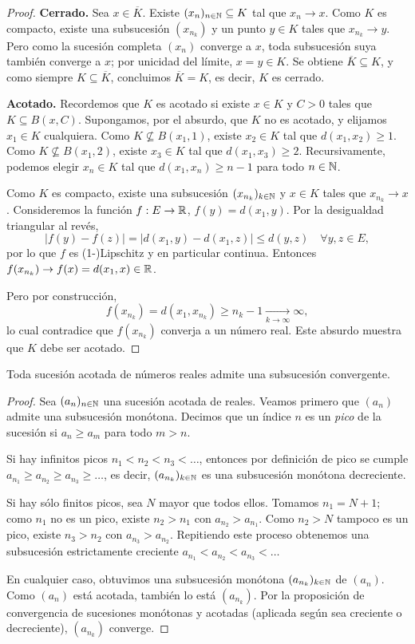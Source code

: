 \begin{proof}
\textbf{Cerrado.} Sea $x \in \overline{K}$. Existe $(x_n)_{n\in\mathbb{N}}\subseteq K$
tal que $x_n \to x$. Como $K$ es compacto, existe una subsucesión
$(x_{n_k})$ y un punto $y\in K$ tales que $x_{n_k}\to y$. Pero como la
sucesión completa $(x_n)$ converge a $x$, toda subsucesión suya también
converge a $x$; por unicidad del límite, $x=y \in K$. Se obtiene
$\overline{K}\subseteq K$, y como siempre $K\subseteq\overline{K}$,
concluimos $\overline{K}=K$, es decir, $K$ es cerrado.

\textbf{Acotado.} Recordemos que $K$ es acotado si existe $x\in K$ y $C>0$
tales que $K\subseteq B(x,C)$. Supongamos, por el absurdo, que $K$ no es
acotado, y elijamos $x_1\in K$ cualquiera. Como $K\not\subseteq B(x_1,1)$,
existe $x_2\in K$ tal que $d(x_1,x_2)\ge 1$. Como $K\not\subseteq
B(x_1,2)$, existe $x_3\in K$ tal que $d(x_1,x_3)\ge 2$. Recursivamente,
podemos elegir $x_n\in K$ tal que $d(x_1,x_n)\ge n-1$ para todo $n\in\mathbb{N}$.

Como $K$ es compacto, existe una subsucesión $(x_{n_k})_{k\in\mathbb{N}}$ y
$x\in K$ tales que $x_{n_k}\to x$. Consideremos la función
$f:E\to\mathbb{R}$, $f(y)=d(x_1,y)$. Por la desigualdad triangular al revés,
\[
|f(y)-f(z)| = |d(x_1,y)-d(x_1,z)| \le d(y,z) \quad \forall y,z\in E,
\]
por lo que $f$ es (1-)Lipschitz y en particular continua. Entonces
$f(x_{n_k})\to f(x) = d(x_1,x) \in \mathbb{R}$.

Pero por construcción,
\[
f(x_{n_k}) = d(x_1,x_{n_k}) \ge n_k - 1 \xrightarrow[k\to\infty]{} \infty,
\]
lo cual contradice que $f(x_{n_k})$ converja a un número real. Este
absurdo muestra que $K$ debe ser acotado.
\end{proof}

\begin{lema}
Toda sucesión acotada de números reales admite una subsucesión
convergente.
\end{lema}

\begin{proof}
Sea $(a_n)_{n\in\mathbb{N}}$ una sucesión acotada de reales. Veamos primero que
$(a_n)$ admite una subsucesión monótona. Decimos que un índice $n$ es un
\emph{pico} de la sucesión si $a_n \ge a_m$ para todo $m>n$.

Si hay infinitos picos $n_1<n_2<n_3<\dots$, entonces por definición de
pico se cumple $a_{n_1}\ge a_{n_2}\ge a_{n_3}\ge \dots$, es decir,
$(a_{n_k})_{k\in\mathbb{N}}$ es una subsucesión monótona decreciente.

Si hay sólo finitos picos, sea $N$ mayor que todos ellos. Tomamos
$n_1 = N+1$; como $n_1$ no es un pico, existe $n_2>n_1$ con
$a_{n_2}>a_{n_1}$. Como $n_2>N$ tampoco es un pico, existe $n_3>n_2$ con
$a_{n_3}>a_{n_2}$. Repitiendo este proceso obtenemos una subsucesión
estrictamente creciente $a_{n_1}<a_{n_2}<a_{n_3}<\dots$

En cualquier caso, obtuvimos una subsucesión monótona $(a_{n_k})_{k\in\mathbb{N}}$
de $(a_n)$. Como $(a_n)$ está acotada, también lo está $(a_{n_k})$. Por
la proposición de convergencia de sucesiones monótonas y acotadas
(aplicada según sea creciente o decreciente), $(a_{n_k})$ converge.
\end{proof}

